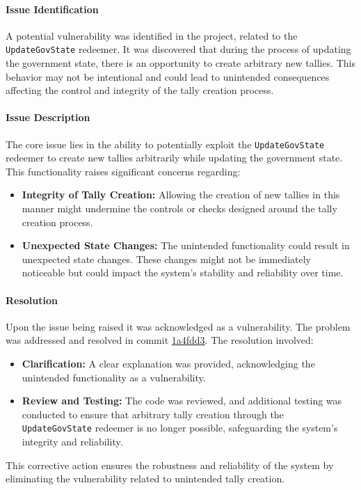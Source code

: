 \documentclass[11pt]{article}
\begin{document}
\paragraph{Issue Identification}
A potential vulnerability was identified in the project, related to the \texttt{UpdateGovState} redeemer.
It was discovered that during the process of updating the government state, there is an opportunity to create arbitrary new tallies.
This behavior may not be intentional and could lead to unintended consequences affecting the control and integrity of the tally creation process.

\paragraph{Issue Description}
The core issue lies in the ability to potentially exploit the \texttt{UpdateGovState} redeemer to create new tallies arbitrarily while updating the government state.
This functionality raises significant concerns regarding:
\begin{itemize}
    \item \textbf{Integrity of Tally Creation:} Allowing the creation of new tallies in this manner might undermine the controls or checks designed around the tally creation process.
    \item \textbf{Unexpected State Changes:} The unintended functionality could result in unexpected state changes. These changes might not be immediately noticeable but could impact the system's stability and reliability over time.
\end{itemize}

\paragraph{Resolution}
Upon the issue being raised it was acknowledged as a vulnerability.
The problem was addressed and resolved in commit \href{https://github.com/MuesliSwapTeam/muesliswap-atala-onchain-governance/commit/1a4fdd35a69a374dee71f0192c61de08be7b9602}{1a4fdd3}. The resolution involved:
\begin{itemize}
    \item \textbf{Clarification:} A clear explanation was provided, acknowledging the unintended functionality as a vulnerability.
    \item \textbf{Review and Testing:} The code was reviewed, and additional testing was conducted to ensure that arbitrary tally creation through the \texttt{UpdateGovState} redeemer is no longer possible, safeguarding the system's integrity and reliability.
\end{itemize}
This corrective action ensures the robustness and reliability of the system by eliminating the vulnerability related to unintended tally creation.
\end{document}
